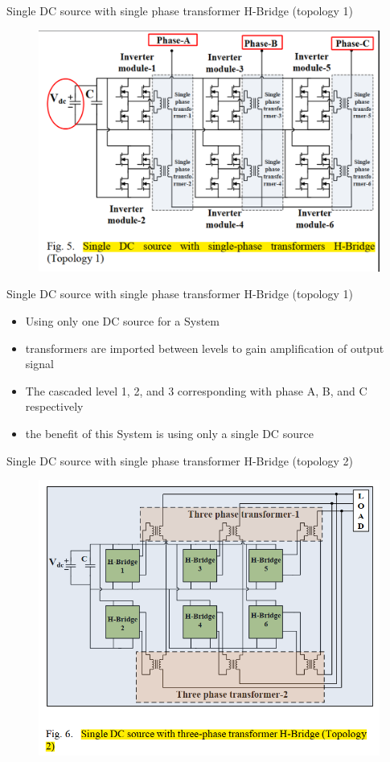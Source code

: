 \documentclass[
	11pt, %
]{beamer}
\begin{document}
\begin{frame}{Single DC source with single phase transformer H-Bridge (topology 1)}
	\begin{figure}
		\includegraphics[width=0.7\linewidth]{Topology1.png}
	\end{figure}
\end{frame}

\begin{frame}{Single DC source with single phase transformer H-Bridge (topology 1)}
	\begin{itemize}
		\setlength{\itemsep}{10pt}
		\item {Using only one DC source for a System}
		\item {transformers are imported between levels to gain amplification of output signal}
		\item {The cascaded level 1, 2, and 3 corresponding with phase A, B, and C respectively}
		\item {the benefit of this System is using only a single DC source}
	\end{itemize}
\end{frame}


\begin{frame}{Single DC source with single phase transformer H-Bridge (topology 2)}
	\begin{figure}
		\includegraphics[width=0.6\linewidth]{Topology2.png}
	\end{figure}
\end{frame}
\end{document}
